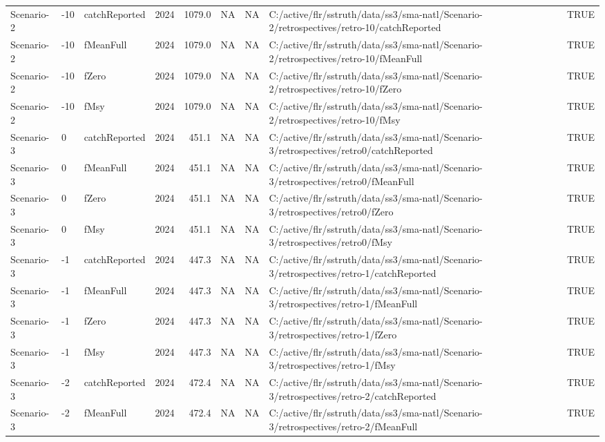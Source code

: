 \begin{table}
\begin{tabular}[t]{lllrrrrll}
\addlinespace
Scenario-2 & -10 & catchReported & 2024 & 1079.0 & NA & NA & C:/active/flr/sstruth/data/ss3/sma-natl/Scenario-2/retrospectives/retro-10/catchReported & TRUE\\
Scenario-2 & -10 & fMeanFull & 2024 & 1079.0 & NA & NA & C:/active/flr/sstruth/data/ss3/sma-natl/Scenario-2/retrospectives/retro-10/fMeanFull & TRUE\\
Scenario-2 & -10 & fZero & 2024 & 1079.0 & NA & NA & C:/active/flr/sstruth/data/ss3/sma-natl/Scenario-2/retrospectives/retro-10/fZero & TRUE\\
Scenario-2 & -10 & fMsy & 2024 & 1079.0 & NA & NA & C:/active/flr/sstruth/data/ss3/sma-natl/Scenario-2/retrospectives/retro-10/fMsy & TRUE\\
Scenario-3 & 0 & catchReported & 2024 & 451.1 & NA & NA & C:/active/flr/sstruth/data/ss3/sma-natl/Scenario-3/retrospectives/retro0/catchReported & TRUE\\
\addlinespace
Scenario-3 & 0 & fMeanFull & 2024 & 451.1 & NA & NA & C:/active/flr/sstruth/data/ss3/sma-natl/Scenario-3/retrospectives/retro0/fMeanFull & TRUE\\
Scenario-3 & 0 & fZero & 2024 & 451.1 & NA & NA & C:/active/flr/sstruth/data/ss3/sma-natl/Scenario-3/retrospectives/retro0/fZero & TRUE\\
Scenario-3 & 0 & fMsy & 2024 & 451.1 & NA & NA & C:/active/flr/sstruth/data/ss3/sma-natl/Scenario-3/retrospectives/retro0/fMsy & TRUE\\
Scenario-3 & -1 & catchReported & 2024 & 447.3 & NA & NA & C:/active/flr/sstruth/data/ss3/sma-natl/Scenario-3/retrospectives/retro-1/catchReported & TRUE\\
Scenario-3 & -1 & fMeanFull & 2024 & 447.3 & NA & NA & C:/active/flr/sstruth/data/ss3/sma-natl/Scenario-3/retrospectives/retro-1/fMeanFull & TRUE\\
\addlinespace
Scenario-3 & -1 & fZero & 2024 & 447.3 & NA & NA & C:/active/flr/sstruth/data/ss3/sma-natl/Scenario-3/retrospectives/retro-1/fZero & TRUE\\
Scenario-3 & -1 & fMsy & 2024 & 447.3 & NA & NA & C:/active/flr/sstruth/data/ss3/sma-natl/Scenario-3/retrospectives/retro-1/fMsy & TRUE\\
Scenario-3 & -2 & catchReported & 2024 & 472.4 & NA & NA & C:/active/flr/sstruth/data/ss3/sma-natl/Scenario-3/retrospectives/retro-2/catchReported & TRUE\\
Scenario-3 & -2 & fMeanFull & 2024 & 472.4 & NA & NA & C:/active/flr/sstruth/data/ss3/sma-natl/Scenario-3/retrospectives/retro-2/fMeanFull & TRUE\\

\end{tabular}
\end{table}
